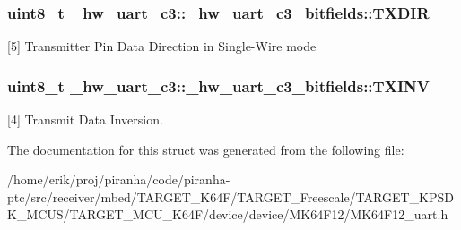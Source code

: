 \subsubsection[{\texorpdfstring{T\+X\+D\+IR}{TXDIR}}]{\setlength{\rightskip}{0pt plus 5cm}uint8\+\_\+t \+\_\+hw\+\_\+uart\+\_\+c3\+::\+\_\+hw\+\_\+uart\+\_\+c3\+\_\+bitfields\+::\+T\+X\+D\+IR}\hypertarget{struct__hw__uart__c3_1_1__hw__uart__c3__bitfields_a4189ffc40d5ddd43e42653c873bdf9f8}{}\label{struct__hw__uart__c3_1_1__hw__uart__c3__bitfields_a4189ffc40d5ddd43e42653c873bdf9f8}
\mbox{[}5\mbox{]} Transmitter Pin Data Direction in Single-\/\+Wire mode 
\subsubsection[{\texorpdfstring{T\+X\+I\+NV}{TXINV}}]{\setlength{\rightskip}{0pt plus 5cm}uint8\+\_\+t \+\_\+hw\+\_\+uart\+\_\+c3\+::\+\_\+hw\+\_\+uart\+\_\+c3\+\_\+bitfields\+::\+T\+X\+I\+NV}\hypertarget{struct__hw__uart__c3_1_1__hw__uart__c3__bitfields_af67bb2128af738831c3e38354c2978e1}{}\label{struct__hw__uart__c3_1_1__hw__uart__c3__bitfields_af67bb2128af738831c3e38354c2978e1}
\mbox{[}4\mbox{]} Transmit Data Inversion. 

The documentation for this struct was generated from the following file\+:\begin{DoxyCompactItemize}
\item 
/home/erik/proj/piranha/code/piranha-\/ptc/src/receiver/mbed/\+T\+A\+R\+G\+E\+T\+\_\+\+K64\+F/\+T\+A\+R\+G\+E\+T\+\_\+\+Freescale/\+T\+A\+R\+G\+E\+T\+\_\+\+K\+P\+S\+D\+K\+\_\+\+M\+C\+U\+S/\+T\+A\+R\+G\+E\+T\+\_\+\+M\+C\+U\+\_\+\+K64\+F/device/device/\+M\+K64\+F12/M\+K64\+F12\+\_\+uart.\+h\end{DoxyCompactItemize}

